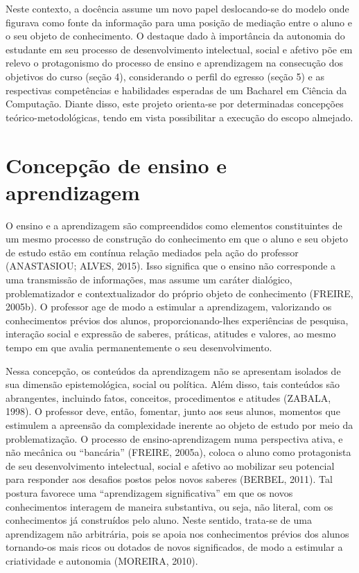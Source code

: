 \documentclass[
	12pt,				%
	openright,			%
  oneside,     %
	a4paper,			%
	chapter=TITLE,		%
	english,			%
	french,				%
	spanish,			%
	brazil				%
	]{abntex2}
\begin{document}
Neste contexto, a docência assume um novo papel deslocando-se do modelo onde figurava como fonte da informação para uma posição de mediação entre o aluno e o seu objeto de conhecimento. O destaque dado à importância da autonomia do estudante em seu processo de desenvolvimento intelectual, social e afetivo põe em relevo o protagonismo do processo de ensino e aprendizagem na consecução dos objetivos do curso (seção 4), considerando o perfil do egresso (seção 5) e as respectivas competências e habilidades esperadas de um Bacharel em Ciência da Computação. Diante disso, este projeto orienta-se por determinadas concepções teórico-metodológicas, tendo em vista possibilitar a execução do escopo almejado.

\section{Concepção de ensino e aprendizagem}

O ensino e a aprendizagem são compreendidos como elementos constituintes de um mesmo processo de construção do conhecimento em que o aluno e seu objeto de estudo estão em contínua relação mediados pela ação do professor (ANASTASIOU; ALVES, 2015). Isso significa que o ensino não corresponde a uma transmissão de informações, mas assume um caráter dialógico, problematizador e contextualizador do próprio objeto de conhecimento (FREIRE, 2005b). O professor age de modo a estimular a aprendizagem, valorizando os conhecimentos prévios dos alunos, proporcionando-lhes experiências de pesquisa, interação social e expressão de saberes, práticas, atitudes e valores, ao mesmo tempo em que avalia permanentemente o seu desenvolvimento.

Nessa concepção, os conteúdos da aprendizagem não se apresentam isolados de sua dimensão epistemológica, social ou política. Além disso, tais conteúdos são abrangentes, incluindo fatos, conceitos, procedimentos e atitudes (ZABALA, 1998). O professor deve, então, fomentar, junto aos seus alunos, momentos que estimulem a apreensão da complexidade inerente ao objeto de estudo por meio da problematização. O processo de ensino-aprendizagem numa perspectiva ativa, e não mecânica ou “bancária” (FREIRE, 2005a), coloca o aluno como protagonista de seu desenvolvimento intelectual, social e afetivo ao mobilizar seu potencial para responder aos desafios postos pelos novos saberes (BERBEL, 2011). Tal postura favorece uma “aprendizagem significativa” em que os novos conhecimentos interagem de maneira substantiva, ou seja, não literal, com os conhecimentos já construídos pelo aluno. Neste sentido, trata-se de uma aprendizagem não arbitrária, pois se apoia nos conhecimentos prévios dos alunos tornando-os mais ricos ou dotados de novos significados, de modo a estimular a criatividade e autonomia (MOREIRA, 2010).
\end{document}
